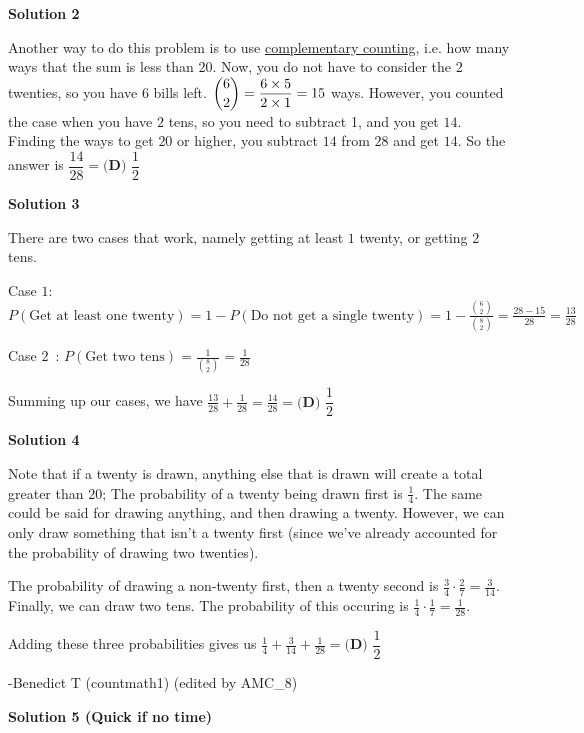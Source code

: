 \begin{enumerate}
 



\textbf{Solution 2}

Another way to do this problem is to use \href{https://artofproblemsolving.com/wiki/index.php?title=Complementary\_counting}{complementary counting}, i.e. how many ways that the sum is less than $20$. Now, you do not have to consider the $2$ twenties, so you have $6$ bills left. $\dbinom{6}{2} = \dfrac{6\times5}{2\times1} = 15$ ways. However, you counted the case when you have $2$ tens, so you need to subtract 1, and you get $14$. Finding the ways to get $20$ or higher, you subtract $14$ from $28$ and get $14$. So the answer is $\dfrac{14}{28} = \boxed{\textbf{(D) }\dfrac{1}{2}}$




\textbf{Solution 3}

There are two cases that work, namely getting at least $1$ twenty, or getting $2$ tens.

 Case $1$: $P(\text{Get at least one twenty}) = 1-P(\text{Do not get a single twenty})=1- \frac{\binom{6}{2}}{\binom{8}{2}}=\frac{28-15}{28}=\frac{13}{28}$

 Case $2$ : $P(\text{Get two tens}) = \frac{1}{\binom{8}{2}} = \frac{1}{28}$

 Summing up our cases, we have $\frac{13}{28}+\frac{1}{28}=\frac{14}{28}=\boxed{\textbf{(D) } \dfrac{1}{2}}$




\textbf{Solution 4}

Note that if a twenty is drawn, anything else that is drawn will create a total greater than $20$; The probability of a twenty being drawn first is $\frac{1}{4}.$ The same could be said for drawing anything, and then drawing a twenty. However, we can only draw something that isn't a twenty first (since we've already accounted for the probability of drawing two twenties). 

 The probability of drawing a non-twenty first, then a twenty second is $\frac{3}{4}\cdot\frac{2}{7}=\frac{3}{14}.$ Finally, we can draw two tens. The probability of this occuring is $\frac{1}{4}\cdot\frac{1}{7}=\frac{1}{28}.$ 

 Adding these three probabilities gives us $\frac{1}{4}+\frac{3}{14}+\frac{1}{28}=\boxed{\textbf{(D) } \dfrac{1}{2}}$

 -Benedict T (countmath1) (edited by AMC\_8)

 



\textbf{Solution 5 (Quick if no time)}


\end{enumerate}
